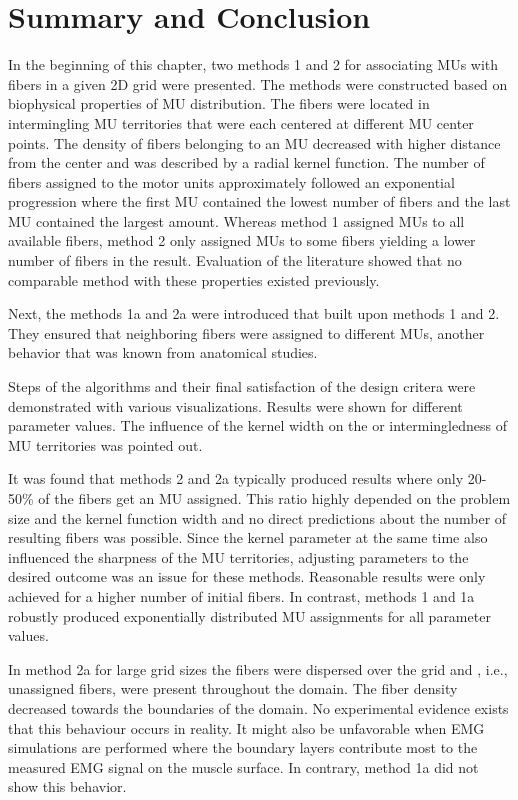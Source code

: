 \section{Summary and Conclusion}\label{sec:mu_conclusion}
In the beginning of this chapter, two methods 1 and 2 for associating MUs with fibers in a given 2D grid were presented. The methods were constructed based on biophysical properties of MU distribution. The fibers were located in intermingling MU territories that were each centered at different MU center points.
The density of fibers belonging to an MU decreased with higher distance from the center and was described by a radial kernel function.
The number of fibers assigned to the motor units approximately followed an exponential progression where the first MU contained the lowest number of fibers and the last MU contained the largest amount. 
Whereas method 1 assigned MUs to all available fibers, method 2 only assigned MUs to some fibers yielding a lower number of fibers in the result.
Evaluation of the literature showed that no comparable method with these properties existed previously.

Next, the methods 1a and 2a were introduced that built upon methods 1 and 2. They ensured that neighboring fibers were assigned to different MUs, another behavior that was known from anatomical studies.

Steps of the algorithms and their final satisfaction of the design critera were demonstrated with various visualizations. Results were shown for different parameter values. The influence of the kernel width on the  or intermingledness of MU territories was pointed out. 

It was found that methods 2 and 2a typically produced results where only 20-50\% of the fibers get an MU assigned. This ratio highly depended on the problem size and the kernel function width and no direct predictions about the number of resulting fibers was possible. Since the kernel parameter at the same time also influenced the sharpness of the MU territories, adjusting parameters to the desired outcome was an issue for these methods. Reasonable results were only achieved for a higher number of initial fibers. In contrast, methods 1 and 1a robustly produced exponentially distributed MU assignments for all parameter values.

In method 2a for large grid sizes the fibers were dispersed over the grid and , i.e., unassigned fibers, were present throughout the domain. The fiber density decreased towards the boundaries of the domain. No experimental evidence exists that this behaviour occurs in reality. It might also be unfavorable when EMG simulations are performed where the boundary layers contribute most to the measured EMG signal on the muscle surface. In contrary, method 1a did not show this behavior.

